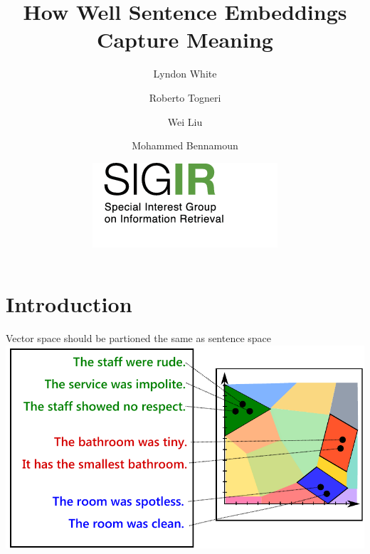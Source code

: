\documentclass[12pt,landscape,english]{beamer}
\begin{document}

\title[White et al.]{How Well Sentence Embeddings Capture Meaning}
\author[White et al.]{Lyndon White \and Roberto Togneri \and Wei Liu \and Mohammed Bennamoun}
\date{\includegraphics[scale=0.4]{ss}}

\begin{frame}[plain]
	\titlepage
\end{frame}



\section{Introduction}


\begin{frame}{Vector space should be partioned the same as sentence space}
 \includegraphics[scale=0.6]{equiv}
\end{frame}
\end{document}

